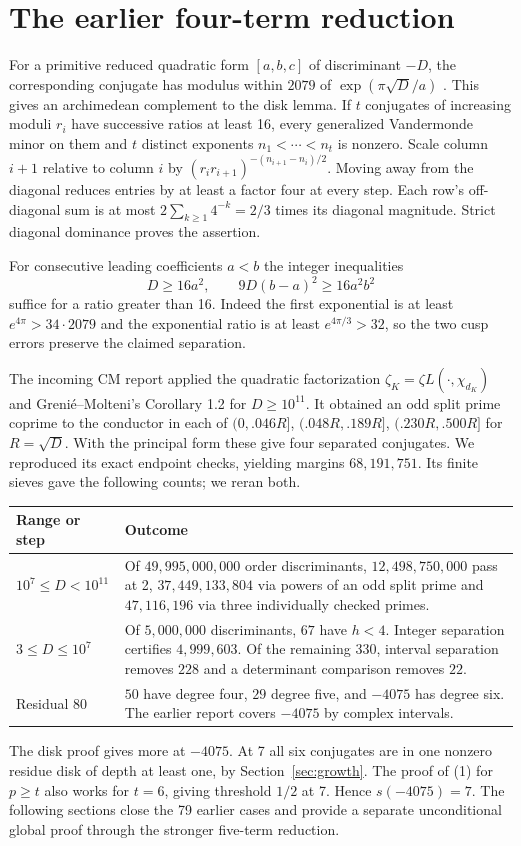 \section{The earlier four-term reduction}\label{sec:prior}
For a primitive reduced quadratic form $[a,b,c]$ of discriminant $-D$, the corresponding conjugate has modulus within $2079$ of $\exp(\pi\sqrt D/a)$ \cite{riffaut}. This gives an archimedean complement to the disk lemma. If $t$ conjugates of increasing moduli $r_i$ have successive ratios at least 16, every generalized Vandermonde minor on them and $t$ distinct exponents $n_1<\cdots<n_t$ is nonzero. Scale column $i+1$ relative to column $i$ by $(r_ir_{i+1})^{-(n_{i+1}-n_i)/2}$. Moving away from the diagonal reduces entries by at least a factor four at every step. Each row's off-diagonal sum is at most $2\sum_{k\ge1}4^{-k}=2/3$ times its diagonal magnitude. Strict diagonal dominance proves the assertion.

For consecutive leading coefficients $a<b$ the integer inequalities
\[
       D\ge16a^2,\qquad 9D(b-a)^2\ge16a^2b^2                         \tag{2}
\]
suffice for a ratio greater than 16. Indeed the first exponential is at least $e^{4\pi}>34\cdot2079$ and the exponential ratio is at least $e^{4\pi/3}>32$, so the two cusp errors preserve the claimed separation.

 The incoming CM report \cite{prior} applied the quadratic factorization $\zeta_K=\zeta L(\cdot,\chi_{d_K})$ and Greni\'e--Molteni's Corollary 1.2 \cite{gm} for $D\ge10^{11}$. It obtained an odd split prime coprime to the conductor in each of $(0,.046R]$, $(.048R,.189R]$, $(.230R,.500R]$ for $R=\sqrt D$. With the principal form these give four separated conjugates. We reproduced its exact endpoint checks, yielding margins $68,191,751$. Its finite sieves gave the following counts; we reran both.
\begin{center}\small
\begin{tabular}{@{}p{.26\linewidth}p{.65\linewidth}@{}}\toprule
Range or step & Outcome \\ \midrule
$10^7\le D<10^{11}$ &
Of $49{,}995{,}000{,}000$ order discriminants, $12{,}498{,}750{,}000$ pass at 2, $37{,}449{,}133{,}804$ via powers of an odd split prime and $47{,}116{,}196$ via three individually checked primes. \\[2pt]
$3\le D\le10^7$ &
Of $5{,}000{,}000$ discriminants, $67$ have $h<4$. Integer separation certifies $4{,}999{,}603$. Of the remaining $330$, interval separation removes $228$ and a determinant comparison removes $22$. \\[2pt]
Residual $80$ & $50$ have degree four, $29$ degree five, and $-4075$ has degree six. The earlier report covers $-4075$ by complex intervals. \\ \bottomrule
\end{tabular}
\end{center}
The disk proof gives more at $-4075$. At 7 all six conjugates are in one nonzero residue disk of depth at least one, by Section~\ref{sec:growth}. The proof of (1) for $p\ge t$ also works for $t=6$, giving threshold $1/2$ at 7. Hence $s(-4075)=7$. The following sections close the 79 earlier cases and provide a separate unconditional global proof through the stronger five-term reduction.
